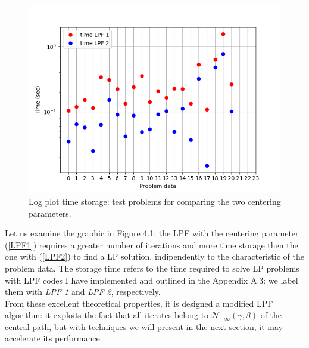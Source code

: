 \documentclass[a4paper,10 pt,titlepage,twoside]{book}
\theoremstyle{plain}
\theoremstyle{definition}
\theoremstyle{remark}
\begin{document}
\begin{figure}\label{fig:float}
\begin{center}
\includegraphics[width=9 cm]{timeLPF12}\caption{Log plot time storage: test problems for comparing the two centering parameters.} 
\end{center}
\end{figure}
Let us examine the graphic in Figure 4.1: the LPF with the centering parameter (\ref{LPF1}) requires a greater number of iterations and more time storage then the one with (\ref{LPF2}) to find a LP solution, indipendently to the characteristic of the problem data. The storage time refers to the time required to solve LP problems with LPF codes I have implemented and outlined in the Appendix A.3: we label them with \textit{LPF 1} and \textit{LPF 2}, respectively.\\[1 cm]
From these excellent theoretical properties, it is designed a modified LPF algorithm: it exploits the fact that all iterates belong to $\mathcal{N}_{-\infty}(\gamma,\beta)$ of the central path, but with techniques we will present in the next section, it may accelerate its performance. 
\end{document}
